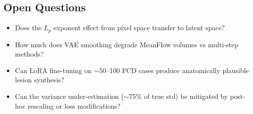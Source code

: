 \subsection{Open Questions}

\begin{itemize}[nosep]
  \item Does the $L_p$ exponent effect from pixel space transfer to latent
    space?
  \item How much does VAE smoothing degrade MeanFlow volumes vs multi-step
    methods?
  \item Can LoRA fine-tuning on ${\sim}$50--100 FCD cases produce anatomically
    plausible lesion synthesis?
  \item Can the variance under-estimation (${\sim}$75\% of true std) be
    mitigated by post-hoc rescaling or loss modifications?
\end{itemize}
